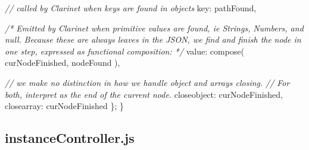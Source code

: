 \documentclass[]{article}
\newenvironment{Shaded}{}{}
\newcommand{\DataTypeTok}[1]{\textcolor[rgb]{0.56,0.13,0.00}{{#1}}}
\newcommand{\CommentTok}[1]{\textcolor[rgb]{0.38,0.63,0.69}{\textit{{#1}}}}
\newcommand{\FunctionTok}[1]{\textcolor[rgb]{0.02,0.16,0.49}{{#1}}}
\newcommand{\NormalTok}[1]{{#1}}
\begin{document}
\begin{Shaded}
\begin{Highlighting}[]
      \CommentTok{// called by Clarinet when keys are found in objects               }
      \DataTypeTok{key}\NormalTok{: pathFound,}
      
      \CommentTok{/* Emitted by Clarinet when primitive values are found, ie Strings,}
\CommentTok{         Numbers, and null.}
\CommentTok{         Because these are always leaves in the JSON, we find and finish the }
\CommentTok{         node in one step, expressed as functional composition: */}
      \DataTypeTok{value}\NormalTok{: }\FunctionTok{compose}\NormalTok{( curNodeFinished, nodeFound ),}
      
      \CommentTok{// we make no distinction in how we handle object and arrays closing.}
      \CommentTok{// For both, interpret as the end of the current node.}
      \DataTypeTok{closeobject}\NormalTok{: curNodeFinished,}
      \DataTypeTok{closearray}\NormalTok{: curNodeFinished       }
   \NormalTok{\};}
\NormalTok{\}}
\end{Highlighting}
\end{Shaded}

\pagebreak

\subsection{instanceController.js}
\end{document}
